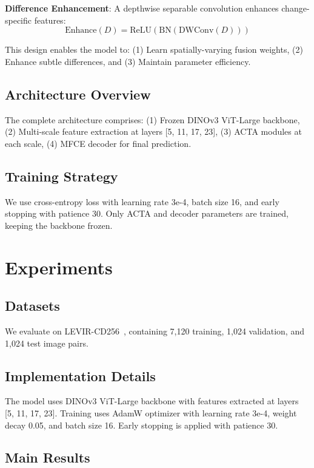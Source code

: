 \documentclass{IEEEtran}
\begin{document}
\textbf{Difference Enhancement}: A depthwise separable convolution enhances change-specific features:
\begin{equation}
\text{Enhance}(D) = \text{ReLU}(\text{BN}(\text{DWConv}(D)))
\end{equation}

This design enables the model to: (1) Learn spatially-varying fusion weights, (2) Enhance subtle differences, and (3) Maintain parameter efficiency.

\subsection{Architecture Overview}

The complete architecture comprises: (1) Frozen DINOv3 ViT-Large backbone, (2) Multi-scale feature extraction at layers [5, 11, 17, 23], (3) ACTA modules at each scale, (4) MFCE decoder for final prediction.

\subsection{Training Strategy}

We use cross-entropy loss with learning rate 3e-4, batch size 16, and early stopping with patience 30. Only ACTA and decoder parameters are trained, keeping the backbone frozen.

\section{Experiments}
\label{sec:experiments}

\subsection{Datasets}

We evaluate on LEVIR-CD256~\cite{chen2020levir}, containing 7,120 training, 1,024 validation, and 1,024 test image pairs.

\subsection{Implementation Details}

The model uses DINOv3 ViT-Large backbone with features extracted at layers [5, 11, 17, 23]. Training uses AdamW optimizer with learning rate 3e-4, weight decay 0.05, and batch size 16. Early stopping is applied with patience 30.

\subsection{Main Results}
\end{document}
